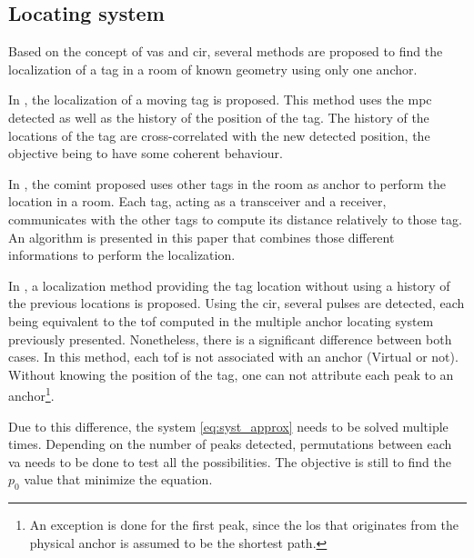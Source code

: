 \subsection{Locating system}
\label{loc_syst_mpc}

Based on the concept of \gls{vas} and \gls{cir}, several methods are proposed to find the localization of a tag in a room of known geometry using only one anchor.
\vspace{2mm}

In \cite{meissner2010mc}, the localization of a moving tag is proposed. This method uses the \gls{mpc} detected as well as the history of the position of the tag. The history of the locations of the tag are cross-correlated with the new detected position, the objective being to have some coherent behaviour.
\vspace{2mm}

In \cite{froehle2013cooperative}, the \gls{comint} proposed uses other tags in the room as anchor to perform the location in a room. Each tag, acting as a transceiver and a receiver, communicates with the other tags to compute its distance relatively to those tag. An algorithm is presented in this paper that combines those different informations to perform the localization.
\vspace{2mm}

In \cite{jespersen2018indoor}, a localization method providing the tag location without using a history of the previous locations is proposed. Using the \gls{cir}, several pulses are detected, each being equivalent to the \gls{tof} computed in the multiple anchor locating system previously presented. Nonetheless, there is a significant difference between both cases. In this method, each \gls{tof} is not associated with an anchor (Virtual or not). Without knowing the position of the tag, one can not attribute each peak to an anchor\footnote{An exception is done for the first peak, since the \gls{los} that originates from the physical anchor is assumed to be the shortest path.}.
\vspace{2mm}

Due to this difference, the system \ref{eq:syst_approx} needs to be solved multiple times. Depending on the number of peaks detected, permutations between each \gls{va} needs to be done to test all the possibilities. The objective is still to find the $p_0$ value that minimize the equation.



